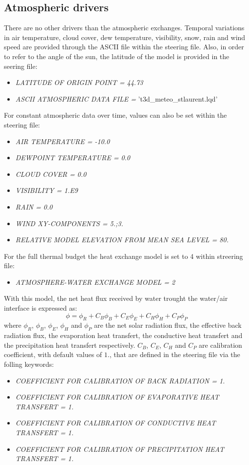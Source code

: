 \subsection{Atmospheric drivers}

There are no other drivers than the atmospheric exchanges. Temporal variations in air temperature, cloud cover, dew temperature, visibility, snow, rain and wind speed are provided through the ASCII file within the  steering file. Also, in order to refer to the angle of the sun, the latitude of the model is provided in the  seering file:
\begin{itemize}
    \item\textit{LATITUDE OF ORIGIN POINT = 44.73}
    \item\textit{ASCII ATMOSPHERIC DATA FILE =} 't3d\_meteo\_stlaurent.lqd'
\end{itemize}
For constant atmospheric data over time, values can also be set within the \khione steering file:
\begin{itemize}
    \item\textit{AIR TEMPERATURE      = -10.0}
    \item\textit{DEWPOINT TEMPERATURE =   0.0}
    \item\textit{CLOUD COVER          =   0.0}
    \item\textit{VISIBILITY           =   1.E9}
    \item\textit{RAIN                 =   0.0}
    \item\textit{WIND XY-COMPONENTS   =   5.;3.}
    \item\textit{RELATIVE MODEL ELEVATION FROM MEAN SEA LEVEL = 80.}
\end{itemize}

For the full thermal budget the heat exchange model is set to 4 within \khione streering file:
\begin{itemize}
    \item\textit{ATMOSPHERE-WATER EXCHANGE MODEL = 2}
\end{itemize}
With this model, the net heat flux received by water trought the water/air interface is expressed as:
\begin{equation}
\phi = \phi_R + C_B\phi_B + C_E\phi_E + C_H\phi_H + C_P\phi_P
\end{equation}
where $\phi_R$, $\phi_B$, $\phi_E$, $\phi_H$ and $\phi_P$ are the net solar radiation flux, the effective back
radiation flux, the evaporation heat transfert, the conductive heat transfert and the precipitation heat
transfert respectively. $C_B$, $C_E$, $C_H$ and $C_P$ are calibration coefficient, with default values of $1.$,
that are defined in the \khione steering file via the folling keywords:
\begin{itemize}
    \item\textit{COEFFICIENT FOR CALIBRATION OF BACK RADIATION = 1.}
    \item\textit{COEFFICIENT FOR CALIBRATION OF EVAPORATIVE HEAT TRANSFERT = 1.}
    \item\textit{COEFFICIENT FOR CALIBRATION OF CONDUCTIVE HEAT TRANSFERT = 1.}
    \item\textit{COEFFICIENT FOR CALIBRATION OF PRECIPITATION HEAT TRANSFERT = 1.}
\end{itemize}

